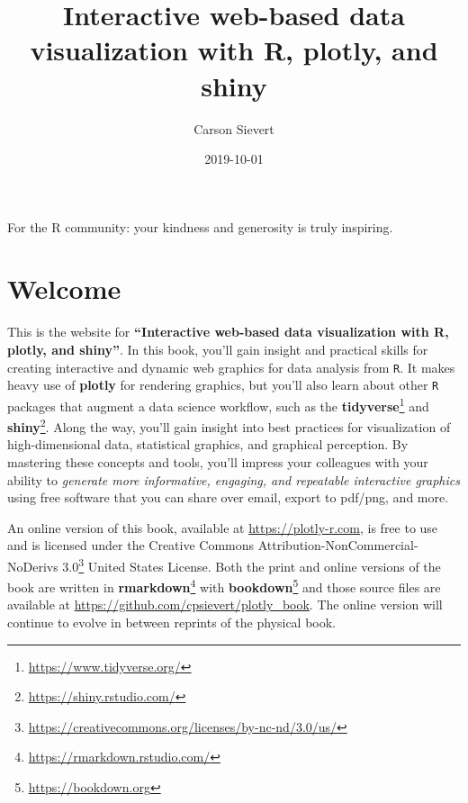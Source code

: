 \documentclass[
  12pt,
]{krantz}
\title{Interactive web-based data visualization with R, plotly, and shiny}
\author{Carson Sievert}
\date{2019-10-01}
\renewcommand{\href}[2]{#2\footnote{\url{#1}}}
\begin{document}
\maketitle

\thispagestyle{empty}
\begin{center}
For the R community: your kindness and generosity is truly inspiring.
\end{center}

\setlength{\abovedisplayskip}{-5pt}
\setlength{\abovedisplayshortskip}{-5pt}

{
\hypersetup{linkcolor=}
\setcounter{tocdepth}{2}
\tableofcontents
}
\hypertarget{welcome}{%
\chapter*{Welcome}\label{welcome}}


This is the website for \textbf{``Interactive web-based data visualization with R, plotly, and shiny''}. In this book, you'll gain insight and practical skills for creating interactive and dynamic web graphics for data analysis from \texttt{R}. It makes heavy use of \textbf{plotly} for rendering graphics, but you'll also learn about other \texttt{R} packages that augment a data science workflow, such as the \href{https://www.tidyverse.org/}{\textbf{tidyverse}} and \href{https://shiny.rstudio.com/}{\textbf{shiny}}. Along the way, you'll gain insight into best practices for visualization of high-dimensional data, statistical graphics, and graphical perception. By mastering these concepts and tools, you'll impress your colleagues with your ability to \emph{generate more informative, engaging, and repeatable interactive graphics} using free software that you can share over email, export to pdf/png, and more.

An online version of this book, available at \url{https://plotly-r.com}, is free to use and is licensed under the \href{https://creativecommons.org/licenses/by-nc-nd/3.0/us/}{Creative Commons Attribution-NonCommercial-NoDerivs 3.0} United States License. Both the print and online versions of the book are written in \href{https://rmarkdown.rstudio.com/}{\textbf{rmarkdown}} with \href{https://bookdown.org}{\textbf{bookdown}} and those source files are available at \url{https://github.com/cpsievert/plotly_book}. The online version will continue to evolve in between reprints of the physical book.
\end{document}
